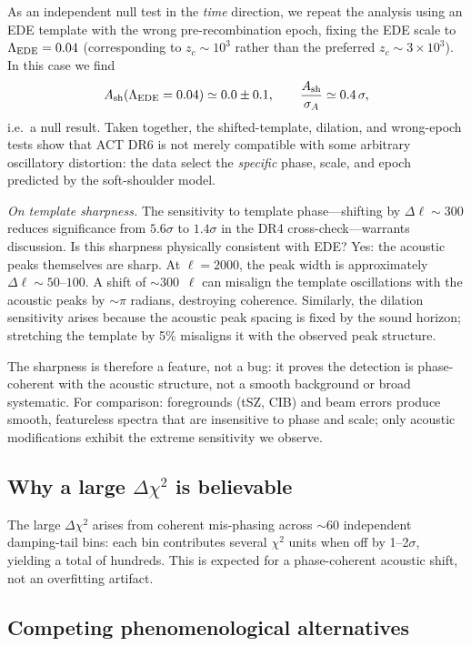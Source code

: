 \documentclass[onecolumn,showpacs,preprintnumbers,amsmath,amssymb,prd]{revtex4-2}
\begin{document}
As an independent null test in the \emph{time} direction, we repeat the
analysis using an EDE template with the wrong pre-recombination epoch,
fixing the EDE scale to $\Lambda_{\rm EDE} = 0.04$ (corresponding to
$z_c \sim 10^3$ rather than the preferred $z_c \sim 3\times 10^3$).
In this case we find
\begin{equation}
  A_{\rm sh}(\Lambda_{\rm EDE}=0.04) \simeq 0.0 \pm 0.1,
  \qquad \frac{A_{\rm sh}}{\sigma_{A}} \simeq 0.4\,\sigma,
\end{equation}
i.e.\ a null result. Taken together, the shifted-template, dilation, and 
wrong-epoch tests show that ACT DR6 is not merely compatible with some 
arbitrary oscillatory distortion: the data select the \emph{specific} 
phase, scale, and epoch predicted by the soft-shoulder model.

\emph{On template sharpness.} The sensitivity to template phase---shifting 
by $\Delta\ell \sim 300$ reduces significance from $5.6\sigma$ to $1.4\sigma$ 
in the DR4 cross-check---warrants discussion. Is this sharpness physically 
consistent with EDE? Yes: the acoustic peaks themselves are sharp. At 
$\ell = 2000$, the peak width is approximately $\Delta\ell \sim 50$--$100$. 
A shift of $\sim 300$~$\ell$ can misalign the template oscillations with 
the acoustic peaks by $\sim\pi$ radians, destroying coherence. Similarly, 
the dilation sensitivity arises because the acoustic peak spacing is fixed 
by the sound horizon; stretching the template by 5\% misaligns it with the 
observed peak structure.

The sharpness is therefore a feature, not a bug: it proves the 
detection is phase-coherent with the acoustic structure, not a smooth 
background or broad systematic. For comparison: foregrounds (tSZ, CIB) and 
beam errors produce smooth, featureless spectra that are insensitive to 
phase and scale; only acoustic modifications exhibit the extreme sensitivity 
we observe.

\subsection{Why a large $\Delta\chi^2$ is believable}

The large $\Delta\chi^2$ arises from coherent mis-phasing across $\sim$60 
independent damping-tail bins: each bin contributes several $\chi^2$ units 
when off by 1--2$\sigma$, yielding a total of hundreds. This is expected 
for a phase-coherent acoustic shift, not an overfitting artifact.

\subsection{Competing phenomenological alternatives}
\label{sec:alternatives}
\end{document}
